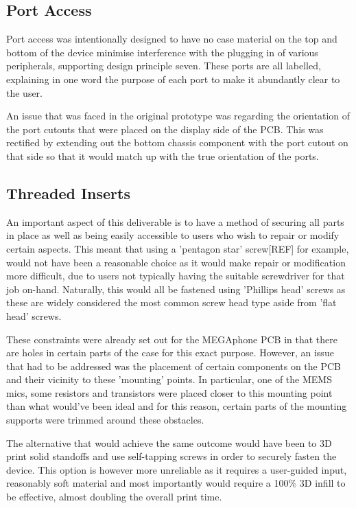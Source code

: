 \subsection{Port Access}

Port access was intentionally designed to have no case material on the top and bottom of the device minimise interference with the plugging in of various peripherals, supporting design principle seven.
These ports are all labelled, explaining in one word the purpose of each port to make it abundantly clear to the user.

An issue that was faced in the original prototype was regarding the orientation of the port cutouts that were placed on the display side of the PCB.
This was rectified by extending out the bottom chassis component with the port cutout on that side so that it would match up with the true orientation of the ports. %

\subsection{Threaded Inserts}

An important aspect of this deliverable is to have a method of securing all parts in place as well as being easily accessible to users who wish to repair or modify certain aspects.
This meant that using a 'pentagon star' screw[REF] for example, would not have been a reasonable choice as it would make repair or modification more difficult, due to users not typically having the suitable screwdriver for that job on-hand.
Naturally, this would all be fastened using 'Phillips head' screws as these are widely considered the most common screw head type aside from 'flat head' screws.

These constraints were already set out for the MEGAphone PCB in that there are holes in certain parts of the case for this exact purpose.
However, an issue that had to be addressed was the placement of certain components on the PCB and their vicinity to these 'mounting' points.
In particular, one of the MEMS mics, some resistors and transistors were placed closer to this mounting point than what would've been ideal and for this reason, certain parts of the mounting supports were trimmed around these obstacles.

The alternative that would achieve the same outcome would have been to 3D print solid standoffs and use self-tapping screws in order to securely fasten the device.
This option is however more unreliable as it requires a user-guided input, reasonably soft material and most importantly would require a 100\% 3D infill to be effective, almost doubling the overall print time.

